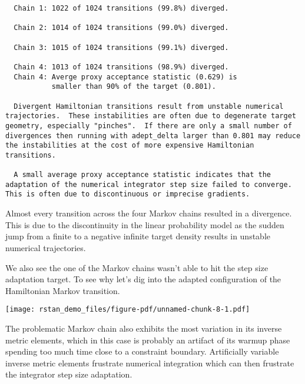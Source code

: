 \documentclass[
  letterpaper,
  DIV=11,
  numbers=noendperiod]{scrartcl}
\newenvironment{Shaded}{\begin{snugshade}}{\end{snugshade}}
\newcommand{\DecValTok}[1]{\textcolor[rgb]{0.68,0.00,0.00}{#1}}
\newcommand{\FunctionTok}[1]{\textcolor[rgb]{0.28,0.35,0.67}{#1}}
\newcommand{\NormalTok}[1]{\textcolor[rgb]{0.00,0.23,0.31}{#1}}
\newcommand{\SpecialCharTok}[1]{\textcolor[rgb]{0.37,0.37,0.37}{#1}}
\begin{document}
\begin{verbatim}
  Chain 1: 1022 of 1024 transitions (99.8%) diverged.

  Chain 2: 1014 of 1024 transitions (99.0%) diverged.

  Chain 3: 1015 of 1024 transitions (99.1%) diverged.

  Chain 4: 1013 of 1024 transitions (98.9%) diverged.
  Chain 4: Averge proxy acceptance statistic (0.629) is
           smaller than 90% of the target (0.801).

  Divergent Hamiltonian transitions result from unstable numerical
trajectories.  These instabilities are often due to degenerate target
geometry, especially "pinches".  If there are only a small number of
divergences then running with adept_delta larger than 0.801 may reduce
the instabilities at the cost of more expensive Hamiltonian
transitions.

  A small average proxy acceptance statistic indicates that the
adaptation of the numerical integrator step size failed to converge.
This is often due to discontinuous or imprecise gradients.
\end{verbatim}

Almost every transition across the four Markov chains resulted in a
divergence. This is due to the discontinuity in the linear probability
model as the sudden jump from a finite to a negative infinite target
density results in unstable numerical trajectories.

We also see the one of the Markov chains wasn't able to hit the step
size adaptation target. To see why let's dig into the adapted
configuration of the Hamiltonian Markov transition.

\begin{Shaded}
\end{Shaded}

\texttt{[image: rstan\_demo\_files/figure-pdf/unnamed-chunk-8-1.pdf]}

The problematic Markov chain also exhibits the most variation in its
inverse metric elements, which in this case is probably an artifact of
its warmup phase spending too much time close to a constraint boundary.
Artificially variable inverse metric elements frustrate numerical
integration which can then frustrate the integrator step size
adaptation.
\end{document}
